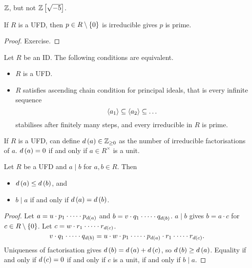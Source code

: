 \begin{example1}
$ \mathbb{Z} $, but not $ \mathbb{Z}\left[ \sqrt{-5} \right] $.
\end{example1}

\begin{lemma}
If $ R $ is a UFD, then $ p \in R \setminus \left\{ 0 \right\} $ is irreducible gives $ p $ is prime.
\end{lemma}

\begin{proof}
Exercise.
\end{proof}

\begin{theorem}
\label{thm:ufdacc}
Let $ R $ be an ID. The following conditions are equivalent.
\begin{itemize}
\item $ R $ is a UFD.
\item $ R $ satisfies ascending chain condition for principal ideals, that is every infinite sequence
$$ \left\langle a_1 \right\rangle \subseteq \left\langle a_2 \right\rangle \subseteq \dots $$
stabilises after finitely many steps, and every irreducible in $ R $ is prime.
\end{itemize}
\end{theorem}

If $ R $ is a UFD, can define $ d\left( a \right) \in \mathbb{Z}_{\ge 0} $ as the number of irreducible factorisations of $ a $. $ d\left( a \right) = 0 $ if and only if $ a \in R^\times $ is a unit.

\begin{lemma}
Let $ R $ be a UFD and $ a \mid b $ for $ a, b \in R $. Then
\begin{itemize}
\item $ d\left( a \right) \le d\left( b \right) $, and
\item $ b \mid a $ if and only if $ d\left( a \right) = d\left( b \right) $.
\end{itemize}
\end{lemma}


\begin{proof}
Let $ a = u \cdot p_1 \cdot \dots \cdot p_{d\left( a \right)} $ and $ b = v \cdot q_1 \cdot \dots \cdot q_{d\left( b \right)} $. $ a \mid b $ gives $ b = a \cdot c $ for $ c \in R \setminus \left\{ 0 \right\} $. Let $ c = w \cdot r_1 \cdot \dots \cdot r_{d\left( c \right)} $.
$$ v \cdot q_1 \cdot \dots \cdot q_{d\left( b \right)} = u \cdot w \cdot p_1 \cdot \dots \cdot p_{d\left( a \right)} \cdot r_1 \cdot \dots \cdot r_{d\left( c \right)}. $$
Uniqueness of factorisation gives $ d\left( b \right) = d\left( a \right) + d\left( c \right) $, so $ d\left( b \right) \ge d\left( a \right) $. Equality if and only if $ d\left( c \right) = 0 $ if and only if $ c $ is a unit, if and only if $ b \mid a $.
\end{proof}

